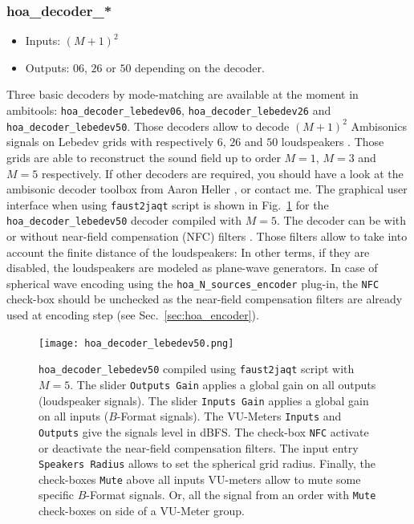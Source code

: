 \documentclass[10pt,a4paper]{article}
\begin{document}
\subsubsection{hoa\_decoder\_*}
\label{sec:hoa_decoder}
\begin{itemize}
\item Inputs: $(M+1)^2$
\item Outputs: $06$, $26$ or $50$ depending on the decoder.
\end{itemize}

Three basic decoders by mode-matching \cite{daniel2000representation,poletti2005three} are available at the moment in ambitools: \lstinline'hoa_decoder_lebedev06', \lstinline'hoa_decoder_lebedev26' and
\lstinline'hoa_decoder_lebedev50'. Those decoders allow to decode $(M+1)^2$ Ambisonics signals on Lebedev grids with respectively $6$, $26$ and $50$ loudspeakers \cite{lebedev1975values,lecomte2015on}. Those grids are able to reconstruct the sound field up to order $M=1$, $M=3$ and $M=5$ respectively.
If other decoders are required, you should have a look at the ambisonic decoder toolbox from Aaron Heller \cite{heller2012toolkit}, or contact me. The graphical user interface when using \lstinline'faust2jaqt' script is shown in Fig.~\ref{fig:hoa_decoder_lebedev50} for the \lstinline'hoa_decoder_lebedev50' decoder compiled with $M=5$. The decoder can be with or without near-field compensation (NFC) filters \cite{daniel2003further,lecomte2015real}. Those filters allow to take into account the finite distance of the loudspeakers: In other terms, if they are disabled, the loudspeakers are modeled as plane-wave generators. In case of spherical wave encoding using the \lstinline'hoa_N_sources_encoder' plug-in, the \lstinline'NFC' check-box should be unchecked as the near-field compensation filters are already used at encoding step (see Sec.~\ref{sec:hoa_encoder}).
\begin{figure}[!ht]
\texttt{[image: hoa\_decoder\_lebedev50.png]}
\caption{\lstinline'hoa_decoder_lebedev50' compiled using \lstinline'faust2jaqt' script with $M=5$. The slider \lstinline'Outputs Gain' applies a global gain on all outputs (loudspeaker signals). The slider \lstinline'Inputs Gain' applies a global gain on all inputs ($B$-Format signals). The VU-Meters \lstinline'Inputs' and \lstinline'Outputs' give the signals level in dBFS. The check-box \lstinline'NFC' activate or deactivate the near-field compensation filters. The input entry \lstinline'Speakers Radius' allows to set the spherical grid radius. Finally, the check-boxes \lstinline'Mute' above all inputs VU-meters allow to mute some specific $B$-Format signals. Or, all the signal from an order with \lstinline'Mute' check-boxes on side of a VU-Meter group.}
\label{fig:hoa_decoder_lebedev50}
\end{figure}
\end{document}
